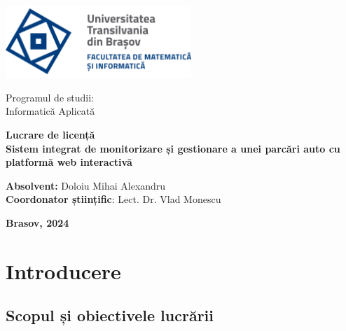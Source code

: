 \documentclass[12pt]{article}
\begin{document}
\begin{titlepage}

    \begin{minipage}{0.6\textwidth}
        \includegraphics[width=7cm]{logo_ro-RO.png}
    \end{minipage}
    \begin{minipage}{0.3\textwidth}
        \center
        {Programul de studii: \\ Informatic\u{a} Aplicat\u{a}}
    \end{minipage}
    
    \vspace*{5 cm} 

    \begin{center}
            {\Large \textbf{Lucrare de licență \\ Sistem integrat de monitorizare și gestionare a unei parc\u{a}ri auto cu platform\u{a} web interactiv\u{a}}}\\[2 cm]        
    \end{center}

    \vspace*{2 cm} 
    
    {\raggedright \normalsize \textbf{Absolvent:} Doloiu Mihai Alexandru \\ \textbf{Coordonator științific}: Lect. Dr. Vlad Monescu}
    
    \vspace*{\fill} 
    \begin{center}
        {\Large \centering \textbf{Brasov, 2024}}
    \end{center}
\end{titlepage}

\tableofcontents

\newpage

\listoffigures

\newpage

\section{Introducere}

\subsection{Scopul și obiectivele lucrării}
\end{document}
